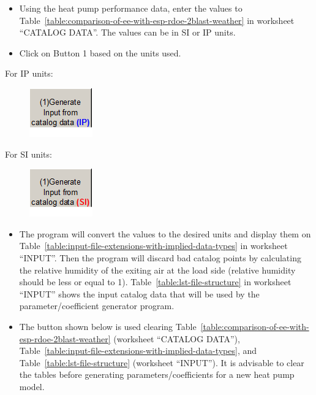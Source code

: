 \begin{itemize}
\item
  Using the heat pump performance data, enter the values to Table~\ref{table:comparison-of-ee-with-esp-rdoe-2blast-weather} in worksheet ``CATALOG DATA''. The values can be in SI or IP units.
\item
  Click on Button 1 based on the units used.
\end{itemize}

For IP units:

\begin{figure}[htbp]
\centering
\includegraphics{media/image046.png}
\caption{}
\end{figure}

For SI units:

\begin{figure}[htbp]
\centering
\includegraphics{media/image047.png}
\caption{}
\end{figure}

\begin{itemize}
\item
  The program will convert the values to the desired units and display them on Table~\ref{table:input-file-extensions-with-implied-data-types} in worksheet ``INPUT''. Then the program will discard bad catalog points by calculating the relative humidity of the exiting air at the load side (relative humidity should be less or equal to 1). Table~\ref{table:lst-file-structure} in worksheet ``INPUT'' shows the input catalog data that will be used by the parameter/coefficient generator program.
\item
  The button shown below is used clearing Table~\ref{table:comparison-of-ee-with-esp-rdoe-2blast-weather} (worksheet ``CATALOG DATA''), Table~\ref{table:input-file-extensions-with-implied-data-types}, and Table~\ref{table:lst-file-structure} (worksheet ``INPUT''). It is advisable to clear the tables before generating parameters/coefficients for a new heat pump model.
\end{itemize}

